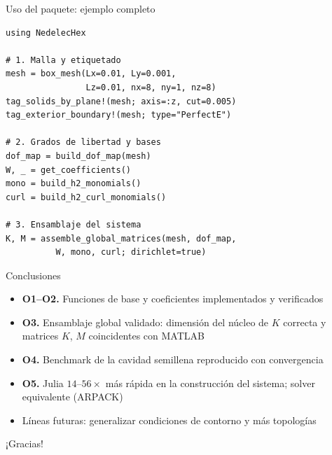 \documentclass{beamer}
\begin{document}
\begin{frame}[fragile]{Uso del paquete: ejemplo completo}
\addtocounter{framenumber}{-1}
\vspace{-0.15cm}
\begin{lstlisting}[style=codestyle]
using NedelecHex

# 1. Malla y etiquetado
mesh = box_mesh(Lx=0.01, Ly=0.001,
                Lz=0.01, nx=8, ny=1, nz=8)
tag_solids_by_plane!(mesh; axis=:z, cut=0.005)
tag_exterior_boundary!(mesh; type="PerfectE")

# 2. Grados de libertad y bases
dof_map = build_dof_map(mesh)
W, _ = get_coefficients()
mono = build_h2_monomials()
curl = build_h2_curl_monomials()

# 3. Ensamblaje del sistema
K, M = assemble_global_matrices(mesh, dof_map,
          W, mono, curl; dirichlet=true)
\end{lstlisting}
\end{frame}

\begin{frame}{Conclusiones}
  \begin{itemize}
    \item \textbf{O1--O2.} Funciones de base y coeficientes implementados y verificados
    \item \textbf{O3.} Ensamblaje global validado: dimensión del núcleo de $K$
      correcta y matrices $K$, $M$ coincidentes con MATLAB
    \item \textbf{O4.} Benchmark de la cavidad semillena reproducido con convergencia
    \item \textbf{O5.} Julia $14$--$56\times$ más rápida en la construcción del sistema; solver equivalente (ARPACK)
    \item Líneas futuras: generalizar condiciones de contorno y más topologías
  \end{itemize}
\end{frame}

\begin{frame}
  \begin{center}
    {\Huge ¡Gracias!}
  \end{center}
  \label{lastmainframe}
\end{frame}
\end{document}
